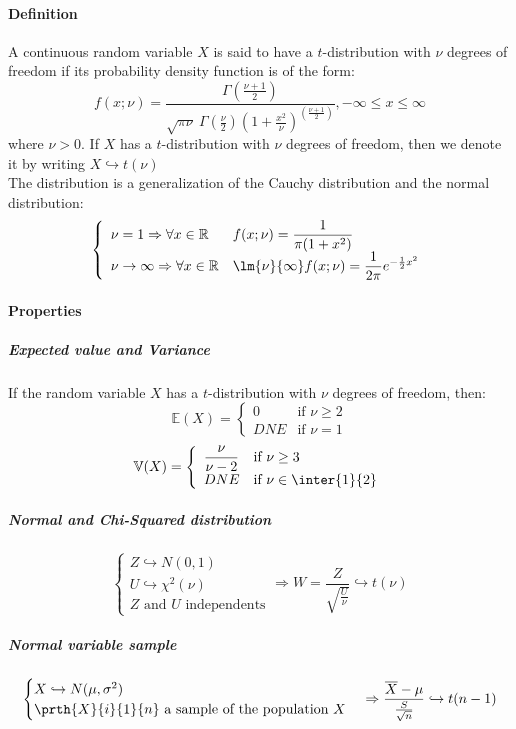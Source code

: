 \paragraph{Definition}
A continuous random variable $X$ is said to have a $t$-distribution 
with $\nu$ degrees of freedom if its probability density function is of
the form:
$$
f(x;\nu) = 
\dfrac{\Gamma\left(\frac{\nu+1}{2}\right)}{\sqrt{\pi\nu}~\Gamma\left(\frac{\nu}{2}\right)\left(1+\frac{x^{2}}{\nu}\right)^{\left(\frac{\nu+1}{2}\right)}}, -\infty\leq x\leq\infty
$$
where $\nu > 0$. If $X$ has a $t$-distribution with $\nu$ degrees of 
freedom, then we denote it by writing $X\hookrightarrow t(\nu)$\\
The distribution is a generalization of the Cauchy distribution and the
normal distribution:
$$
\left\{
\begin{array}{ll}
\nu=1 \Rightarrow \forall x\in \mathbb{R} & f(x;\nu) = \dfrac{1}{\pi(1+x^{2})}\\
\nu\rightarrow\infty \Rightarrow \forall x\in \mathbb{R} & \lm{\nu}{\infty} f(x;\nu) = \dfrac{1}{2\pi}e^{-\frac{1}{2}x^{2}}
\end{array}
\right.
$$
\paragraph{Properties}
\subparagraph{Expected value and Variance}
If the random variable $X$ has a $t$-distribution with $\nu$ degrees of
freedom, then:
$$
\mathbb{E}(X) = 
	\left\{
	\begin{array}{ll}
	0 & \mbox{if } \nu \geq 2\\
	DNE & \mbox{if } \nu = 1
	\end{array}
	\right.
$$
$$
\mathbb{V}(X) = 
	\left\{
	\begin{array}{ll}
		\dfrac{\nu}{\nu-2} & \mbox{if } \nu \geq 3\\
		DNE & \mbox{if } \nu \in \inter{1}{2} 
	\end{array}
	\right.
$$
\subparagraph{Normal and Chi-Squared distribution}
$$
\begin{cases}
Z\hookrightarrow N(0,1)\\
U\hookrightarrow\chi^{2}(\nu)\\
Z\text{ and }U\text{ independents}
\end{cases}
\Rightarrow
W=\dfrac{Z}{\sqrt{\frac{U}{\nu}}}\hookrightarrow t(\nu)
$$
\subparagraph{Normal variable sample}
$$
\begin{cases}
X\hookrightarrow N(\mu,\sigma^{2})\\
\prth{X}{i}{1}{n}\text{ a sample of the population }X
\end{cases}
\Rightarrow
\dfrac{\overline{X}-\mu}{\frac{S}{\sqrt{n}}}\hookrightarrow t(n-1)
$$
